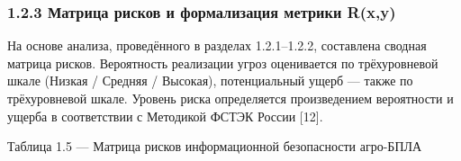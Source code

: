 \documentclass[14pt,a4paper]{extarticle}
\begin{document}
\hypertarget{ux43cux430ux442ux440ux438ux446ux430-ux440ux438ux441ux43aux43eux432-ux438-ux444ux43eux440ux43cux430ux43bux438ux437ux430ux446ux438ux44f-ux43cux435ux442ux440ux438ux43aux438-rxy}{%
\subsubsection{1.2.3 Матрица рисков и формализация метрики R(x,y)}\label{ux43cux430ux442ux440ux438ux446ux430-ux440ux438ux441ux43aux43eux432-ux438-ux444ux43eux440ux43cux430ux43bux438ux437ux430ux446ux438ux44f-ux43cux435ux442ux440ux438ux43aux438-rxy}}

На основе анализа, проведённого в разделах 1.2.1--1.2.2, составлена сводная матрица рисков. Вероятность реализации угроз оценивается по трёхуровневой шкале (Низкая / Средняя / Высокая), потенциальный ущерб --- также по трёхуровневой шкале. Уровень риска определяется произведением вероятности и ущерба в соответствии с Методикой ФСТЭК России {[}12{]}.

Таблица 1.5 --- Матрица рисков информационной безопасности агро-БПЛА
\end{document}
